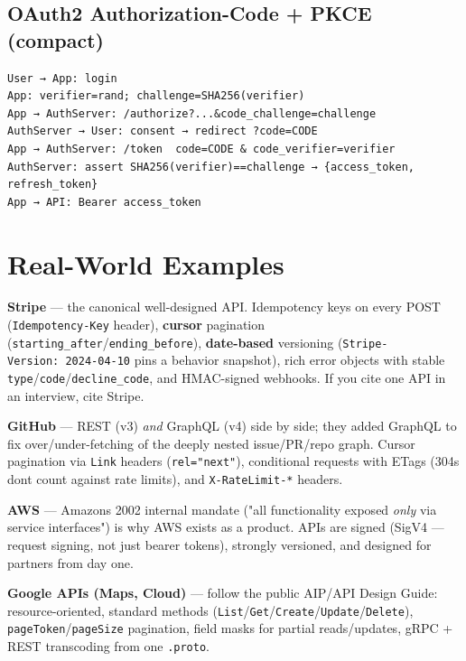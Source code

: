 \documentclass[11pt]{article}
\begin{document}
\subsection{OAuth2 Authorization-Code + PKCE (compact)}\label{oauth2-authorization-code--pkce-compact}

\setcodelang{}

\begin{verbatim}
User → App: login
App: verifier=rand; challenge=SHA256(verifier)
App → AuthServer: /authorize?...&code_challenge=challenge
AuthServer → User: consent → redirect ?code=CODE
App → AuthServer: /token  code=CODE & code_verifier=verifier
AuthServer: assert SHA256(verifier)==challenge → {access_token, refresh_token}
App → API: Bearer access_token
\end{verbatim}

\section{Real-World Examples}\label{real-world-examples}

\textbf{Stripe} --- the canonical well-designed API. Idempotency keys on every POST (\texttt{Idempotency-Key} header), \textbf{cursor} pagination (\texttt{starting\_after}/\texttt{ending\_before}), \textbf{date-based} versioning (\texttt{Stripe-Version:\ 2024-04-10} pins a behavior snapshot), rich error objects with stable \texttt{type}/\texttt{code}/\texttt{decline\_code}, and HMAC-signed webhooks. If you cite one API in an interview, cite Stripe.

\textbf{GitHub} --- REST (v3) \emph{and} GraphQL (v4) side by side; they added GraphQL to fix over/under-fetching of the deeply nested issue/PR/repo graph. Cursor pagination via \texttt{Link} headers (\texttt{rel="next"}), conditional requests with ETags (304s don\textquotesingle t count against rate limits), and \texttt{X-RateLimit-*} headers.

\textbf{AWS} --- Amazon\textquotesingle s 2002 internal mandate ("all functionality exposed \emph{only} via service interfaces") is why AWS exists as a product. APIs are signed (SigV4 --- request signing, not just bearer tokens), strongly versioned, and designed for partners from day one.

\textbf{Google APIs (Maps, Cloud)} --- follow the public AIP/API Design Guide: resource-oriented, standard methods (\texttt{List}/\texttt{Get}/\texttt{Create}/\texttt{Update}/\texttt{Delete}), \texttt{pageToken}/\texttt{pageSize} pagination, field masks for partial reads/updates, gRPC + REST transcoding from one \texttt{.proto}.
\end{document}
